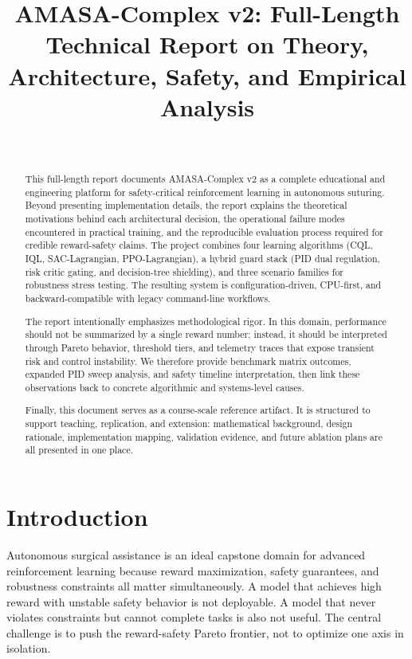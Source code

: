 \documentclass[conference]{IEEEtran}
\title{AMASA-Complex v2: Full-Length Technical Report on Theory, Architecture, Safety, and Empirical Analysis}
\author{\IEEEauthorblockN{Codex}\\
\IEEEauthorblockA{Workspace: \texttt{/Users/tahamajs/Documents/uni/DRL/projects/amasa\_clean}}}
\begin{document}
\maketitle

\begin{abstract}
This full-length report documents AMASA-Complex v2 as a complete educational and engineering platform for safety-critical reinforcement learning in autonomous suturing. Beyond presenting implementation details, the report explains the theoretical motivations behind each architectural decision, the operational failure modes encountered in practical training, and the reproducible evaluation process required for credible reward-safety claims. The project combines four learning algorithms (CQL, IQL, SAC-Lagrangian, PPO-Lagrangian), a hybrid guard stack (PID dual regulation, risk critic gating, and decision-tree shielding), and three scenario families for robustness stress testing. The resulting system is configuration-driven, CPU-first, and backward-compatible with legacy command-line workflows.

The report intentionally emphasizes methodological rigor. In this domain, performance should not be summarized by a single reward number; instead, it should be interpreted through Pareto behavior, threshold tiers, and telemetry traces that expose transient risk and control instability. We therefore provide benchmark matrix outcomes, expanded PID sweep analysis, and safety timeline interpretation, then link these observations back to concrete algorithmic and systems-level causes.

Finally, this document serves as a course-scale reference artifact. It is structured to support teaching, replication, and extension: mathematical background, design rationale, implementation mapping, validation evidence, and future ablation plans are all presented in one place.
\end{abstract}

\section{Introduction}
Autonomous surgical assistance is an ideal capstone domain for advanced reinforcement learning because reward maximization, safety guarantees, and robustness constraints all matter simultaneously. A model that achieves high reward with unstable safety behavior is not deployable. A model that never violates constraints but cannot complete tasks is also not useful. The central challenge is to push the reward-safety Pareto frontier, not to optimize one axis in isolation.
\end{document}
